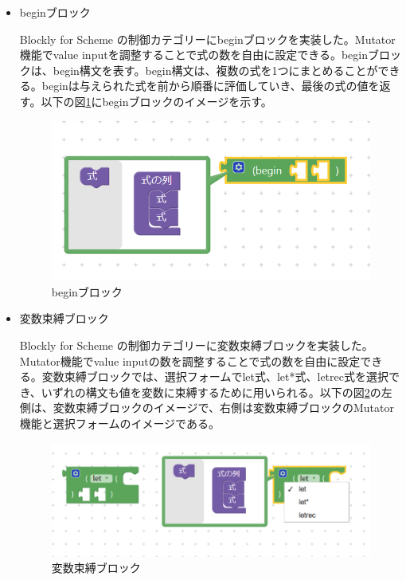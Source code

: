 \documentclass{risepaper}
\begin{document}
\begin{itemize}
\item beginブロック

Blockly for Scheme の制御カテゴリーにbeginブロックを実装した。Mutator機能でvalue inputを調整することで式の数を自由に設定できる。beginブロックは、begin構文を表す。begin構文は、複数の式を1つにまとめることができる。beginは与えられた式を前から順番に評価していき、最後の式の値を返す。以下の図\ref{fig:scheme_begin}にbeginブロックのイメージを示す。

\begin{figure}[h]
\begin{center}
\includegraphics[scale=0.5]{img/scheme_begin.PNG}
\caption{beginブロック}%
\label{fig:scheme_begin}
\end{center}%
\end{figure}%

\item 変数束縛ブロック

Blockly for Scheme の制御カテゴリーに変数束縛ブロックを実装した。Mutator機能でvalue inputの数を調整することで式の数を自由に設定できる。変数束縛ブロックでは、選択フォームでlet式、let*式、letrec式を選択でき、いずれの構文も値を変数に束縛するために用いられる。以下の図\ref{fig:scheme_binding}の左側は、変数束縛ブロックのイメージで、右側は変数束縛ブロックのMutator機能と選択フォームのイメージである。

\begin{figure}[h]
\begin{center}
\includegraphics[scale=0.5]{img/scheme_binding.PNG}
\caption{変数束縛ブロック}%
\label{fig:scheme_binding}
\end{center}%
\end{figure}%


\end{itemize}
\end{document}
